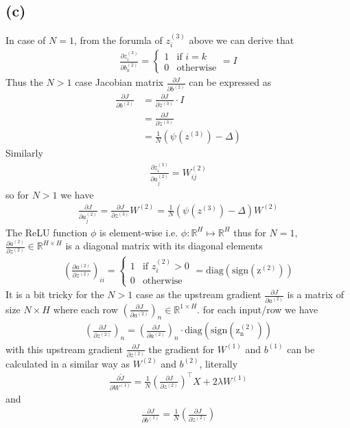 \documentclass{article}
\newcommand{\bb}{b^{(2)}}
\newcommand{\ab}{a^{(2)}}
\newcommand{\zc}{z^{(3)}}
\newcommand{\Wb}{W^{(2)}}
\begin{document}
\subsection*{(c)}
\newcommand{\zb}{z^{(2)}}
\newcommand{\Wa}{W^{(1)}}
\newcommand{\ba}{b^{(1)}}
In case of $N = 1$, from the forumla of $\zc_i$ above we can derive that
\begin{align*}
    \frac{\partial \zc_i}{\partial \bb_k} = \begin{cases}
        1 & \text{if } i = k\\
        0 & \text{otherwise}
    \end{cases} = I
\end{align*}
Thus the $N > 1$ case Jacobian matrix $\frac{\partial J}{\partial \bb}$ can be expressed as
\begin{align*}
    \frac{\partial J}{\partial \bb} &= \frac{\partial J}{\partial \zc} \cdot I\\
    &= \frac{\partial J}{\partial \zc}\\
    &= \frac{1}{N}\left(\psi(z^{(3)}) - \Delta\right)
\end{align*}
Similarly
\begin{align*}
    \frac{\partial \zc_i}{\partial \ab_j} = \Wb_{ij}
\end{align*}
so for $N > 1$ we have
\begin{align*}
\frac{\partial J}{\partial \ab_j} = \frac{\partial J}{\partial \zc}  \Wb = 
\frac{1}{N}\left(\psi(z^{(3)}) - \Delta\right) \Wb
\end{align*}
The ReLU function $\phi$ is element-wise i.e. $\phi : \mathbb{R}^H \mapsto \mathbb{R}^H$
thus for $N = 1$, $\frac{\partial \ab}{\partial \zb} \in \mathbb{R}^{H\times H}$ is a diagonal matrix with its diagonal elements
\begin{align*}
    \left(\frac{\partial \ab}{\partial \zb}\right)_{ii} = \begin{cases}
        1 & \text{if } \zb_{i} > 0\\
        0 & \text{otherwise}
    \end{cases} = \mathrm{diag}(\mathrm{sign(\zb)})
\end{align*}
It is a bit tricky for the $N > 1$ case
as the upstream gradient $\frac{\partial J}{\partial \ab}$ is a matrix of size $N\times H$
where each row $(\frac{\partial J}{\partial \ab})_n\in\mathbb{R}^{1\times H}$.
for each input/row we have 
\begin{align*}
    (\frac{\partial J}{\partial \zb})_n = (\frac{\partial J}{\partial \ab})_n \cdot \mathrm{diag}(\mathrm{sign(\zb_n)})
\end{align*}
with this upstream gradient $\frac{\partial J}{\partial \zb}$
the gradient for $\Wa$ and $\ba$ can be calculated in a similar way as $\Wb$ and $\bb$, literally
\begin{align*}
    \frac{\partial \tilde{J}}{\partial \Wa} = \frac{1}{N}{\left(\frac{\partial J}{\partial \zb}\right)}^\top X + 2\lambda\Wa
\end{align*}
and 
\begin{align*}
    \frac{\partial J}{\partial \ba} = \frac{1}{N}\left(\frac{\partial J}{\partial \zb}\right)
\end{align*}
\end{document}
